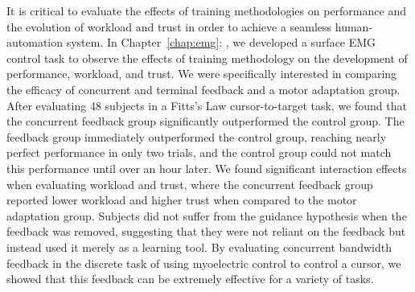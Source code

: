 It is critical to evaluate the effects of training methodologies on performance and the evolution of workload and trust in order to achieve a seamless human-automation system.
In Chapter~\ref{chap:emg}: , we developed a surface EMG control task to observe the effects of training methodology on the development of performance, workload, and trust.
We were specifically interested in comparing the efficacy of concurrent and terminal feedback and a motor adaptation group.
After evaluating 48 subjects in a Fitts's Law cursor-to-target task, we found that the concurrent feedback group significantly outperformed the control group.
The feedback group immediately outperformed the control group, reaching nearly perfect performance in only two trials, and the control group could not match this performance until over an hour later.
We found significant interaction effects when evaluating workload and trust, where the concurrent feedback group reported lower workload and higher trust when compared to the motor adaptation group.
Subjects did not suffer from the guidance hypothesis when the feedback was removed, suggesting that they were not reliant on the feedback but instead used it merely as a learning tool.
By evaluating concurrent bandwidth feedback in the discrete task of using myoelectric control to control a cursor, we showed that this feedback can be extremely effective for a variety of tasks.

